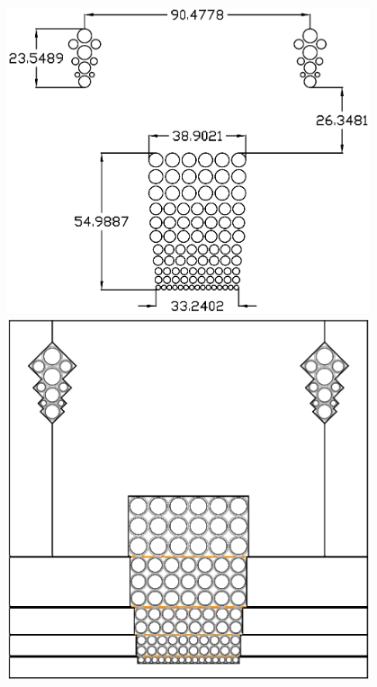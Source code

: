 \begin{figure}[t]
    \centering
    \begin{minipage}[c]{0.5\textwidth}
        \includegraphics[width=0.95\textwidth]{Pak_build/figs/gradpak}
    \end{minipage}
    \hfill
    \begin{minipage}[c]{0.41\textwidth}
        \includegraphics[width=0.95\textwidth]{Pak_build/figs/gradpak_zoom}
    \end{minipage}

\end{figure}
